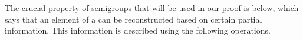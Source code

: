 


The crucial property of semigroups that will be used in our proof is  below, which says that an element of a  can be reconstructed based on certain partial information. This information is described  using the following operations.

